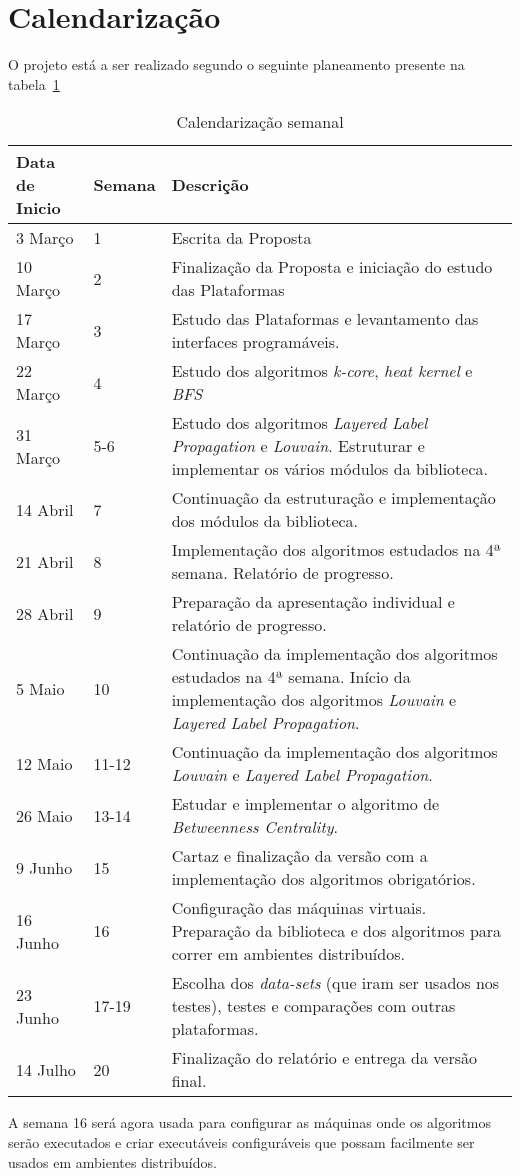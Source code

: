 \section{Calendarização}
O projeto está a ser realizado segundo o seguinte planeamento presente na tabela~\ref{table:planeamento}
\begin{table}
 \caption{ Calendarização semanal}
\label{table:planeamento}
 \begin{tabular}{|l|l|p{9.5cm}|}
 \hline
 \bf{Data de Inicio} & \bf{Semana} & \bf{Descrição} \\ \hline
 3 Março & 1 & Escrita da Proposta \\ \hline
 10 Março & 2 & Finalização da Proposta e iniciação do estudo das Plataformas \\ \hline
 17 Março & 3 & Estudo das Plataformas e levantamento das interfaces programáveis. \\ \hline
 22 Março & 4 & Estudo dos algoritmos \textit{k-core}, \textit{heat kernel} e \textit{BFS}  \\ \hline
 31 Março & 5-6 & Estudo dos algoritmos \textit {Layered Label Propagation} e \textit{Louvain}. Estruturar e implementar os vários módulos da biblioteca.\\ \hline
 14 Abril & 7 & Continuação da estruturação e implementação dos módulos da biblioteca.\\ \hline
 21 Abril & 8 & Implementação dos algoritmos estudados na 4ª semana. Relatório de progresso.\\ \hline
 28 Abril & 9 & Preparação da apresentação individual e relatório de progresso. \\ \hline
 5 Maio & 10 & Continuação da implementação dos algoritmos estudados na 4ª semana. Início da implementação dos algoritmos \textit{Louvain} e \textit{Layered Label Propagation}. \\\hline
 12 Maio & 11-12 & Continuação da implementação dos algoritmos \textit{Louvain} e \textit{Layered Label Propagation}.\\ \hline
 26 Maio & 13-14 & Estudar e implementar o algoritmo de \textit{Betweenness Centrality}. \\ \hline
 9 Junho & 15 & Cartaz e finalização da versão com a implementação dos algoritmos obrigatórios. \\ \hline
 16 Junho & 16 & Configuração das máquinas virtuais. Preparação da biblioteca e dos algoritmos para correr em ambientes distribuídos.\\ \hline
 23 Junho & 17-19 &  Escolha dos \textit{data-sets} (que iram ser usados nos testes), testes e comparações com outras plataformas. \\ \hline
 14 Julho & 20 & Finalização do relatório e entrega da versão final. \\ \hline
\end{tabular}
\end{table}

A semana 16 será agora usada para configurar as máquinas onde os algoritmos serão executados e criar executáveis configuráveis que possam facilmente ser usados em ambientes distribuídos.
